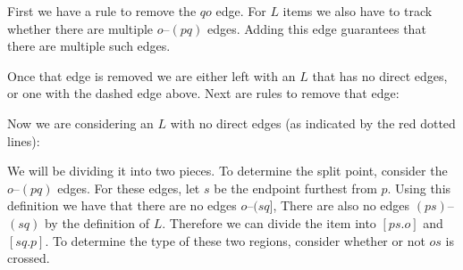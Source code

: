 First we have a rule to remove the $qo$ edge.
For $L$ items we also have to track whether there are multiple $o$--$(pq)$ edges.
Adding this edge guarantees that there are multiple such edges.


Once that edge is removed we are either left with an $L$ that has no direct edges, or one with the dashed edge above.
Next are rules to remove that edge:


Now we are considering an $L$ with no direct edges (as indicated by the red dotted lines):

\begin{center}
\end{center}

We will be dividing it into two pieces.
To determine the split point, consider the $o$--$(pq)$ edges.
For these edges, let $s$ be the endpoint furthest from $p$.
Using this definition we have that there are no edges $o$--$(sq]$, 
There are also no edges $(ps)$--$(sq)$ by the definition of $L$.
Therefore we can divide the item into $[ps.o]$ and $[sq.p]$.
To determine the type of these two regions, consider whether or not $os$ is crossed.


